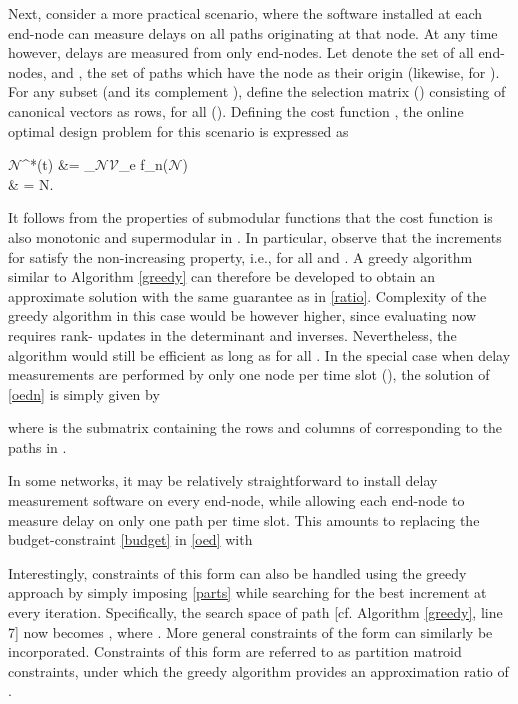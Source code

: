 \documentclass[draftcls,onecolumn,12pt]{IEEEtran}
\providecommand{\abs}[1]{\lvert#1\rvert}												\renewcommand{\b}[1]{\ensuremath{\mathbf{#1}}}		 							\newcommand{\bs}[1]{\ensuremath{\boldsymbol{#1}}}		 						\renewcommand{\c}[1]{\ensuremath{\mathcal{#1}}} 								\newcommand{\E}[1]{\ensuremath{\mathbb{E}\left[#1\right]}} 		  \newcommand{\Es}[1]{\ensuremath{\mathbb{E}^{*}\left[#1\right]}} \newcommand{\ind}{1\hspace{-1.6mm}1}														\newcommand{\norm}[1]{\ensuremath{\left\|#1\right\|}}						\newcommand{\tb}[1]{\ensuremath{\tilde{\mathbf{#1}}}}		 				\newcommand{\mat}[1]{\ensuremath{\begin{bmatrix}#1\end{bmatrix}}}
\def \N {{\c{N}}}
\theoremstyle{plain}\newtheorem{thm}{Theorem}
\theoremstyle{definition}
\theoremstyle{remark}
\begin{document}
Next, consider a more practical scenario, where the software installed at each end-node can measure delays on all paths originating at that node.
At any time  however, delays are measured from only  end-nodes. 
Let  denote the set of all end-nodes, and , the set of paths which have the node  as their origin (likewise,  for ).
For any subset  (and its complement ), define the selection matrix  () consisting of canonical vectors  as rows, for all  ().
Defining the cost function , the online optimal design problem for this scenario is expressed as

\N^{*}(t) &= \arg\min_{\N \subset \c{V}_e} f_n(\N) \label{oedn}\\
&\hspace{0.5cm} \abs{\N} = N.

It follows from the properties of submodular functions that the cost function  is also monotonic and supermodular in .
In particular, observe that the increments  for  satisfy the non-increasing property, i.e.,   for all  and .
A greedy algorithm similar to Algorithm \ref{greedy} can therefore be developed to obtain an approximate solution with the same  guarantee as in \eqref{ratio}. 
Complexity of the greedy algorithm in this case would be however higher, since evaluating  now requires rank- updates in the determinant and inverses. 
Nevertheless, the algorithm would still be efficient as long as  for all .
In the special case when delay measurements are performed by only one node per time slot (), the solution of \eqref{oedn} is simply given by

where  is the  submatrix containing the rows and columns of  corresponding to the paths in . 

In some networks, it may be relatively straightforward to install delay measurement software on every end-node, while allowing each end-node to measure delay on only one path per time slot.
This amounts to replacing the budget-constraint \eqref{budget} in \eqref{oed} with

Interestingly, constraints of this form can also be handled using the greedy approach by simply imposing \eqref{parts} while searching for the best increment at every iteration.
Specifically, the search space of path  [cf. Algorithm  \ref{greedy}, line 7] now becomes , where . 
More general constraints of the form  can similarly be incorporated.
Constraints of this form are referred to as partition matroid constraints, under which the greedy algorithm provides an approximation ratio of  \cite{fisher}.
\end{document}
